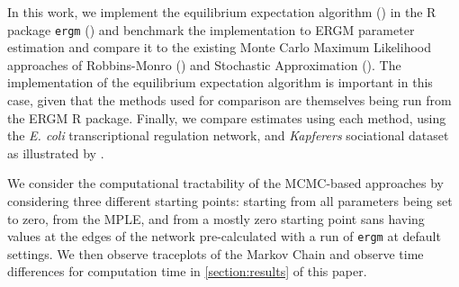 In this work, we implement the equilibrium expectation algorithm (\cite{eqexpectation}) in the R package \texttt{ergm} (\cite{ergm}) and benchmark the implementation to ERGM parameter estimation and compare it to the existing Monte Carlo Maximum Likelihood approaches of Robbins-Monro (\cite{robbinsmonro1951}) and Stochastic Approximation (\cite{snijders2002}). The implementation of the equilibrium expectation algorithm is important in this case, given that the methods used for comparison are themselves being run from the ERGM R package. Finally, we compare estimates using each method, using the \textit{E. coli} transcriptional regulation network, and \textit{Kapferers} sociational dataset as illustrated by \cite{hummels2012}.

We consider the computational tractability of the MCMC-based approaches by considering three different starting points: starting from all parameters being set to zero, from the MPLE, and from a mostly zero starting point sans having values at the edges of the network pre-calculated with a run of \texttt{ergm} at default settings. We then observe traceplots of the Markov Chain and observe time differences for computation time in \ref{section:results} of this paper.